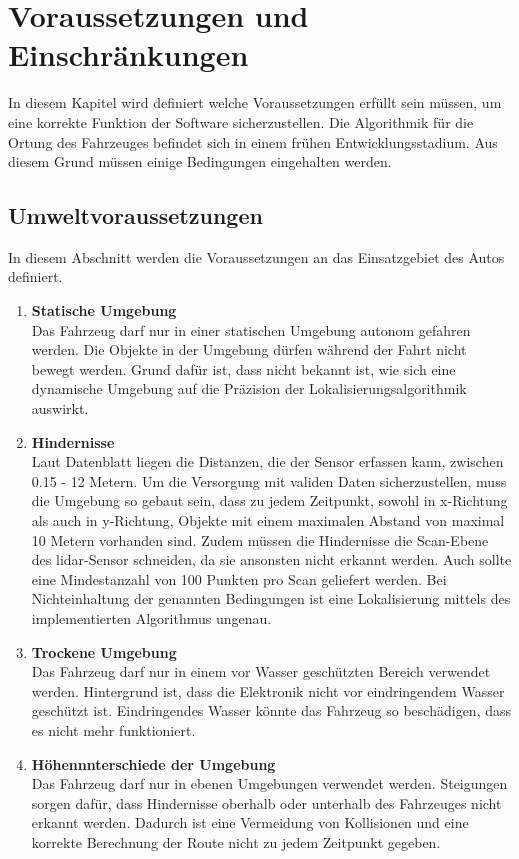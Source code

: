 \section{Voraussetzungen und Einschränkungen}
\label{umwelt}
In diesem Kapitel wird definiert welche Voraussetzungen erfüllt sein müssen, um eine korrekte Funktion der Software sicherzustellen.
Die Algorithmik für die Ortung des Fahrzeuges befindet sich in einem frühen Entwicklungsstadium. 
Aus diesem Grund müssen einige Bedingungen eingehalten werden. 

\subsection{Umweltvoraussetzungen}
In diesem Abschnitt werden die Voraussetzungen an das Einsatzgebiet des Autos definiert.

\begin{enumerate}[leftmargin=*]
    \item \textbf{Statische Umgebung} \\
    Das Fahrzeug darf nur in einer statischen Umgebung autonom gefahren werden. 
    Die Objekte in der Umgebung dürfen während der Fahrt nicht bewegt werden.
    Grund dafür ist, dass nicht bekannt ist, wie sich eine dynamische Umgebung auf die Präzision der Lokalisierungsalgorithmik auswirkt. 
    
    \item \textbf{Hindernisse} \\
    Laut Datenblatt \cite{Slamtec2020} liegen die Distanzen, die der Sensor erfassen kann, zwischen 0.15 - 12 Metern.
    Um die Versorgung mit validen Daten sicherzu\-stellen, muss die Umgebung so gebaut sein, 
    dass zu jedem Zeitpunkt, sowohl in x-Richtung als auch in y-Richtung, Objekte mit einem maximalen Abstand von maximal 10 Metern vorhanden sind.
    Zudem müssen die Hindernisse die Scan-Ebene des \ac{lidar}-Sensor schneiden, da sie ansonsten nicht erkannt werden.
    Auch sollte eine Mindestanzahl von 100 Punkten pro Scan geliefert werden.
    Bei Nichteinhaltung der genannten Bedingungen ist eine Lokalisierung mittels des implementierten Algorithmus ungenau.
    
    \item \textbf{Trockene Umgebung} \\
    Das Fahrzeug darf nur in einem vor Wasser geschützten Bereich verwendet werden.
    Hintergrund ist, dass die Elektronik nicht vor eindringendem Wasser geschützt ist.
    Eindringendes Wasser könnte das Fahrzeug so beschädigen, dass es nicht mehr funktioniert.
   
    \item \textbf{Höhennnterschiede der Umgebung} \\
    Das Fahrzeug darf nur in ebenen Umgebungen verwendet werden. 
    Steigungen sorgen dafür, dass Hindernisse oberhalb oder unterhalb des Fahrzeuges nicht erkannt werden. Dadurch ist eine Vermeidung von Kollisionen 
    und eine korrekte Berechnung der Route nicht zu jedem Zeitpunkt gegeben.
\end{enumerate}

